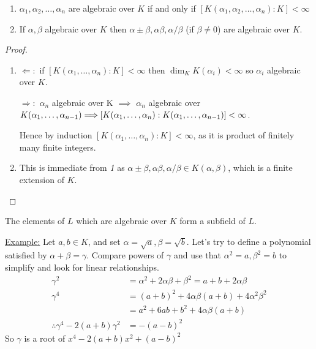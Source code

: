 \documentclass[10pt,a4paper]{article}
\begin{document}
\begin{corollary}\item
\begin{enumerate}
\item $\alpha_1, \alpha_2, \ldots, \alpha_n$ are algebraic over $K$ if and only if $[K(\alpha_1, \alpha_2, \ldots, \alpha_n):K] < \infty$
\item If $\alpha, \beta$ algebraic over $K$ then $\alpha \pm \beta, \alpha\beta, \alpha/\beta$ (if $\beta \neq 0$) are algebraic over $K$.
\end{enumerate}
\begin{proof}
\item
\begin{enumerate}
\item $\Longleftarrow:$ if $[K(\alpha_1, \ldots, \alpha_n):K] < \infty$ then $\dim_K K(\alpha_i) <\infty$ so $\alpha_i$ algebraic over $K$.

$\Longrightarrow:$ $\alpha_n$ algebraic over K $\implies$ $\alpha_n$ algebraic over $K(\alpha_1, \ldots, \alpha_{n-1}) \\\Longrightarrow [K(\alpha_1, \ldots, \alpha_n):K(\alpha_1, \ldots, \alpha_{n-1})] < \infty$.

Hence by induction $[K(\alpha_1, \ldots, \alpha_n):K] < \infty$, as it is product of finitely many finite integers.
\item This is immediate from \textit{1} as $\alpha\pm \beta, \alpha\beta, \alpha/\beta \in K(\alpha,\beta)$, which is a finite extension of $K$.
\end{enumerate}
\end{proof}
\end{corollary}

\begin{corollary}
The elements of $L$ which are algebraic over $K$ form a subfield of $L$.
\end{corollary}
\underline{Example:} Let $a,b \in K$, and set $\alpha=\sqrt{a}, \beta=\sqrt{b}$. Let's try to define a polynomial satisfied by $\alpha+\beta=\gamma$. Compare powers of $\gamma$ and use that $\alpha^2 = a, \beta^2 = b$ to simplify and look for linear relationships.
\begin{align*}
\gamma^2 &= \alpha^2 + 2\alpha\beta + \beta^2 = a+b+2\alpha\beta\\
\gamma^4 &= (a+b)^2 + 4\alpha\beta(a+b) + 4\alpha^2\beta^2\\
&= a^2 + 6ab + b^2 + 4\alpha\beta(a+b)\\
\therefore \gamma^4-2(a+b)\gamma^2 &= -(a-b)^2
\end{align*}
So $\gamma$ is a root of $x^4-2(a+b)x^2+(a-b)^2$
\end{document}
